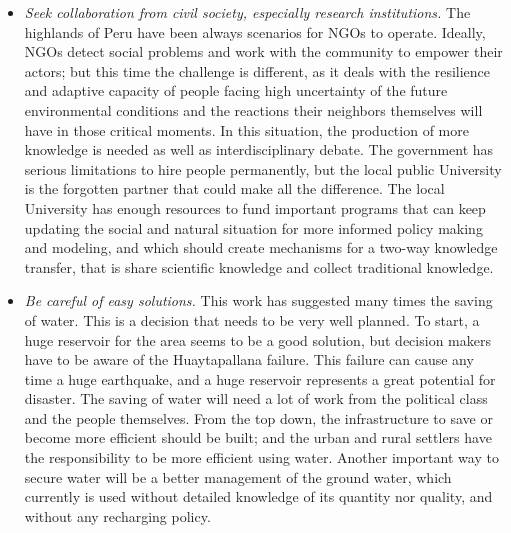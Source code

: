 \documentclass[doc,12pt,floatsintext]{apa7}
\begin{document}
\begin{itemize}
\item \emph{Seek collaboration from civil society, especially research institutions.} The highlands of Peru have been always scenarios for NGOs to operate. Ideally, NGOs detect social problems and work with the community to empower their actors; but this time the challenge is different, as it deals with the resilience and adaptive capacity of people facing high uncertainty of the future environmental conditions and the reactions their neighbors themselves will have in those critical moments. In this situation, the production of more knowledge is needed as well as interdisciplinary debate. The government has serious limitations to hire people permanently, but the local public University is the forgotten partner that could make all the difference. The local University has enough resources to fund important programs that can keep updating the social and natural situation for more informed policy making and modeling, and which should create mechanisms for a two-way knowledge transfer, that is share scientific knowledge and collect traditional knowledge.
\item \emph{Be careful of easy solutions.} This work has suggested many times the saving of water. This is a decision that needs to be very well planned. To start, a huge reservoir for the area seems to be a good solution, but decision makers have to be aware of the Huaytapallana failure. This failure can cause any time a huge earthquake, and a huge reservoir represents a great potential for disaster. The saving of water will need a lot of work from the political class and the people themselves. From the top down, the infrastructure to save or become more efficient should be built; and the urban and rural settlers have the responsibility to be more efficient using water. Another important way to secure water will be a better management of the ground water, which currently is used without detailed knowledge of its quantity nor quality, and without any recharging policy.

\end{itemize}
\end{document}
